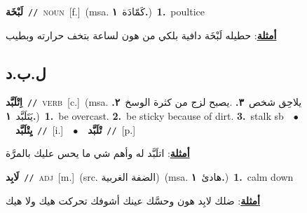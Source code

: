 \documentclass[10pt,a4paper,twoside]{article} %
\begin{document}
\begin{multicols}{2}
{{{{{{\setlength\topsep{0pt}\textbf{\foreignlanguage{arabic}{لَبْخَة}}\ {\color{gray}\texttt{//}\color{black}}\ \textsc{noun}\ [f.]\ \color{gray}(msa. \foreignlanguage{arabic}{كَمّادَة}~\foreignlanguage{arabic}{\textbf{١.}})\color{black}\ \textbf{1.}~poultice\  \begin{flushright}\color{gray}\foreignlanguage{arabic}{\textbf{\underline{\foreignlanguage{arabic}{أمثلة}}}: حطيله لَبْخَة دافية بلكي من هون لساعة بتخف حرارته وبطيب}\end{flushright}\color{black}} \vspace{2mm}

\vspace{-3mm}
\subsection*{\color{blue}\foreignlanguage{arabic}{ل.ب.د}\color{blue}{}} 

{\setlength\topsep{0pt}\textbf{\foreignlanguage{arabic}{اِتْلَبَّد}}\ {\color{gray}\texttt{//}\color{black}}\ \textsc{verb}\ [c.]\ \color{gray}(msa. \foreignlanguage{arabic}{يلاحِق شخص}~\foreignlanguage{arabic}{\textbf{٣.}}  .\foreignlanguage{arabic}{يصبح لزج من كثرة الوسخ}~\foreignlanguage{arabic}{\textbf{٢.}}  \foreignlanguage{arabic}{يَتَلَبَّد}~\foreignlanguage{arabic}{\textbf{١.}})\color{black}\ \textbf{1.}~be overcast.  \textbf{2.}~be sticky because of dirt.  \textbf{3.}~stalk sb\ \ $\bullet$\ \ \setlength\topsep{0pt}\textbf{\foreignlanguage{arabic}{يِتْلَبَّد}}\ {\color{gray}\texttt{//}\color{black}}\ [i.]\ \ $\bullet$\ \ \setlength\topsep{0pt}\textbf{\foreignlanguage{arabic}{تْلَبَّد}}\ {\color{gray}\texttt{//}\color{black}}\ [p.]\  \begin{flushright}\color{gray}\foreignlanguage{arabic}{\textbf{\underline{\foreignlanguage{arabic}{أمثلة}}}: اتلَبَّد له وأهم شي ما يحس عليك بالمرَّة}\end{flushright}\color{black}} \vspace{2mm}

{\setlength\topsep{0pt}\textbf{\foreignlanguage{arabic}{لَابِد}}\ {\color{gray}\texttt{//}\color{black}}\ \textsc{adj}\ [m.]\ (src. \color{gray}\foreignlanguage{arabic}{الضفة الغربية}\color{black})\ \color{gray}(msa. \foreignlanguage{arabic}{هادئ}~\foreignlanguage{arabic}{\textbf{١.}})\color{black}\ \textbf{1.}~calm down\  \begin{flushright}\color{gray}\foreignlanguage{arabic}{\textbf{\underline{\foreignlanguage{arabic}{أمثلة}}}: ضلك لابِد هون وحسَّك عينك أشوفك تحركت هيك ولا هيك}\end{flushright}\color{black}} \vspace{2mm}

}}}}}
\end{multicols}
\end{document}
